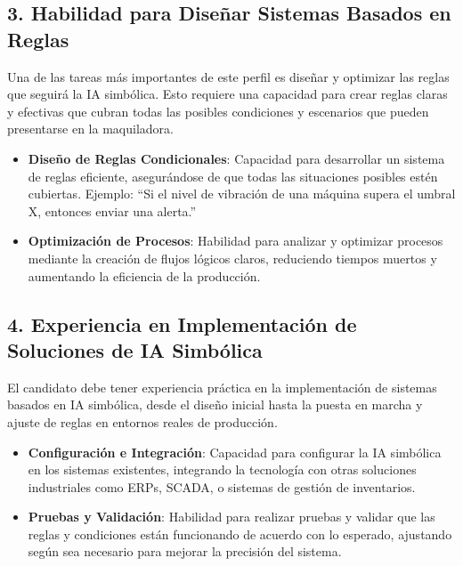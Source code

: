 \documentclass[
  10pt,
  letterpaper,
]{book}
\providecommand{\tightlist}{%
  \setlength{\itemsep}{0pt}\setlength{\parskip}{0pt}}\usepackage{longtable,booktabs,array}
\begin{document}
\subsection{\texorpdfstring{\textbf{3. Habilidad para Diseñar Sistemas
Basados en
Reglas}}{3. Habilidad para Diseñar Sistemas Basados en Reglas}}\label{habilidad-para-diseuxf1ar-sistemas-basados-en-reglas}

Una de las tareas más importantes de este perfil es diseñar y optimizar
las reglas que seguirá la IA simbólica. Esto requiere una capacidad para
crear reglas claras y efectivas que cubran todas las posibles
condiciones y escenarios que pueden presentarse en la maquiladora.

\begin{itemize}
\tightlist
\item
  \textbf{Diseño de Reglas Condicionales}: Capacidad para desarrollar un
  sistema de reglas eficiente, asegurándose de que todas las situaciones
  posibles estén cubiertas. Ejemplo: ``Si el nivel de vibración de una
  máquina supera el umbral X, entonces enviar una alerta.''
\item
  \textbf{Optimización de Procesos}: Habilidad para analizar y optimizar
  procesos mediante la creación de flujos lógicos claros, reduciendo
  tiempos muertos y aumentando la eficiencia de la producción.
\end{itemize}

\subsection{\texorpdfstring{\textbf{4. Experiencia en Implementación de
Soluciones de IA
Simbólica}}{4. Experiencia en Implementación de Soluciones de IA Simbólica}}\label{experiencia-en-implementaciuxf3n-de-soluciones-de-ia-simbuxf3lica}

El candidato debe tener experiencia práctica en la implementación de
sistemas basados en IA simbólica, desde el diseño inicial hasta la
puesta en marcha y ajuste de reglas en entornos reales de producción.

\begin{itemize}
\tightlist
\item
  \textbf{Configuración e Integración}: Capacidad para configurar la IA
  simbólica en los sistemas existentes, integrando la tecnología con
  otras soluciones industriales como ERPs, SCADA, o sistemas de gestión
  de inventarios.
\item
  \textbf{Pruebas y Validación}: Habilidad para realizar pruebas y
  validar que las reglas y condiciones están funcionando de acuerdo con
  lo esperado, ajustando según sea necesario para mejorar la precisión
  del sistema.
\end{itemize}
\end{document}
